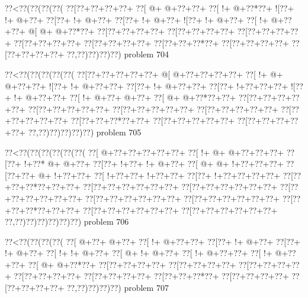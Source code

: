 \vbox{\vbox{\goo
\0??<\0??(\0??(\0??(\0??(
\0??[\0??+\0??+\0??+\0??+
\0??[\- @+\- @+\0??+\0??+
\0??[\- !+\- @+\0??*\0??+
\- ![\0??+\- !+\- @+\0??+
\0??[\0??+\- !+\- @+\0??+
\0??[\0??+\- !+\- @+\0??+
\- ![\0??+\- !+\- @+\0??+
\0??[\- !+\- @+\0??+\0??+
\- @[\- @+\- @+\0??*\0??+
\0??[\0??+\0??+\0??+\0??+
\0??[\0??+\0??+\0??+\0??+
\0??[\0??+\0??+\0??+\0??+
\0??[\0??+\0??+\0??+\0??+
\0??[\0??+\0??+\0??+\0??+
\0??[\0??+\0??+\0??*\0??+
\0??[\0??+\0??+\0??+\0??+
\0??[\0??+\0??+\0??+\0??+
\0??,\0??)\0??)\0??)\0??)
}
\hfil problem 704\hfil\break
}

\vbox{\vbox{\goo
\0??<\0??(\0??(\0??(\0??(\0??(
\0??[\0??+\0??+\0??+\0??+\0??+
\- @[\- @+\0??+\0??+\0??+\0??+
\0??[\- !+\- @+\- @+\0??+\0??+
\- ![\0??+\- !+\- @+\0??+\0??+
\0??[\0??+\- !+\- @+\0??+\0??+
\0??[\0??+\- !+\0??+\0??+\0??+
\- ![\0??+\- !+\- @+\0??+\0??+
\0??[\- !+\- @+\0??+\- @+\0??+
\0??[\- @+\- @+\0??*\0??+\0??+
\0??[\0??+\0??+\0??+\0??+\0??+
\0??[\0??+\0??+\0??+\0??+\0??+
\0??[\0??+\0??+\0??+\0??+\0??+
\0??[\0??+\0??+\0??+\0??+\0??+
\0??[\0??+\0??+\0??+\0??+\0??+
\0??[\0??+\0??+\0??*\0??+\0??+
\0??[\0??+\0??+\0??+\0??+\0??+
\0??[\0??+\0??+\0??+\0??+\0??+
\0??,\0??)\0??)\0??)\0??)\0??)
}
\hfil problem 705\hfil\break
}

\vbox{\vbox{\goo
\0??<\0??(\0??(\0??(\0??(\0??(\0??(
\0??[\- @+\0??+\0??+\0??+\0??+\0??+
\0??[\- !+\- @+\- @+\0??+\0??+\0??+
\0??[\0??+\- !+\0??*\- @+\- @+\0??+
\0??[\0??+\- !+\0??+\- !+\- @+\0??+
\0??[\- @+\- @+\- !+\0??+\0??+\0??+
\0??[\0??+\0??+\- @+\- !+\0??+\0??+
\0??[\- !+\0??+\0??+\- !+\0??+\0??+
\0??[\0??+\- !+\0??+\0??+\0??+\0??+
\0??[\0??+\0??+\0??*\0??+\0??+\0??+
\0??[\0??+\0??+\0??+\0??+\0??+\0??+
\0??[\0??+\0??+\0??+\0??+\0??+\0??+
\0??[\0??+\0??+\0??+\0??+\0??+\0??+
\0??[\0??+\0??+\0??+\0??+\0??+\0??+
\0??[\0??+\0??+\0??+\0??+\0??+\0??+
\0??[\0??+\0??+\0??*\0??+\0??+\0??+
\0??[\0??+\0??+\0??+\0??+\0??+\0??+
\0??[\0??+\0??+\0??+\0??+\0??+\0??+
\0??,\0??)\0??)\0??)\0??)\0??)\0??)
}
\hfil problem 706\hfil\break
}

\vbox{\vbox{\goo
\0??<\0??(\0??(\0??(\0??(
\0??[\- @+\0??+\- @+\0??+
\0??[\- !+\- @+\0??+\0??+
\0??[\0??+\- !+\- @+\0??+
\0??[\0??+\- !+\- @+\0??+
\0??[\- !+\- !+\- @+\0??+
\0??[\- @+\- !+\- @+\0??+
\0??[\- !+\- @+\0??+\0??+
\0??[\- !+\- @+\0??+\0??+
\0??[\- @+\- @+\0??*\0??+
\0??[\0??+\0??+\0??+\0??+
\0??[\0??+\0??+\0??+\0??+
\0??[\0??+\0??+\0??+\0??+
\0??[\0??+\0??+\0??+\0??+
\0??[\0??+\0??+\0??+\0??+
\0??[\0??+\0??+\0??*\0??+
\0??[\0??+\0??+\0??+\0??+
\0??[\0??+\0??+\0??+\0??+
\0??,\0??)\0??)\0??)\0??)
}
\hfil problem 707\hfil\break
}

